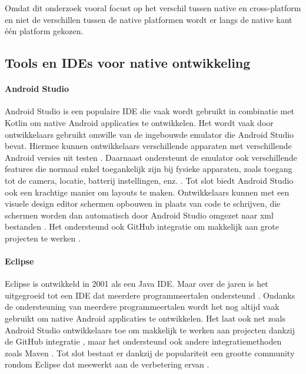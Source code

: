 Omdat dit onderzoek vooral focust op het verschil tussen native en cross-platform en niet 
de verschillen tussen de native platformen wordt er langs de native kant één platform gekozen.



\subsection{Tools en IDEs voor native ontwikkeling}
\paragraph{Android Studio}
Android Studio is een populaire IDE die vaak wordt gebruikt in combinatie met 
Kotlin om native Android applicaties te ontwikkelen. Het wordt vaak door ontwikkelaars 
gebruikt omwille van de ingebouwde \gls{emulator} die Android Studio bevat. Hiermee 
kunnen ontwikkelaars verschillende apparaten met verschillende Android versies uit 
testen \autocite{Medewar2022}. Daarnaast ondersteunt de emulator ook verschillende 
features die normaal enkel toegankelijk zijn bij fysieke apparaten, zoals toegang tot 
de camera, locatie, batterij instellingen, enz. \autocite{Okeke2022}. Tot slot biedt 
Android Studio ook een krachtige manier om layouts te maken. Ontwikkelaars kunnen met 
een visuele design editor schermen opbouwen in plaats van code te schrijven, die schermen 
worden dan automatisch door Android Studio omgezet naar xml bestanden \autocite{Medewar2022}. 
Het ondersteund ook GitHub integratie om makkelijk aan grote projecten te werken \autocite{Studio2023}.

\paragraph{Eclipse}
Eclipse is ontwikkeld in 2001 als een Java IDE. Maar over de jaren is het uitgegroeid 
tot een IDE dat meerdere programmeertalen ondersteund \autocite{Medewar2022}. Ondanks 
de ondersteuning van meerdere programmeertalen wordt het nog altijd vaak gebruikt om native 
Android applicaties te ontwikkelen. Het laat ook net zoals Android Studio ontwikkelaars toe 
om makkelijk te werken aan projecten dankzij de GitHub integratie \autocite{Okeke2022}, maar 
het ondersteund ook andere integratiemethoden zoals Maven \autocite{Medewar2022}. Tot slot 
bestaat er dankzij de populariteit een grootte community rondom Eclipse dat meewerkt aan de 
verbetering ervan \autocite{Medewar2022}.

